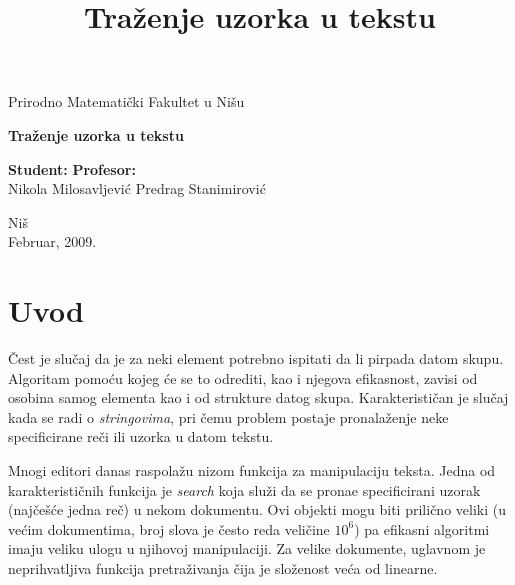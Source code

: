 \documentclass[a4paper,12pt]{article}
\title{\Huge \bf Tra\v zenje uzorka u tekstu}
\begin{document}
\renewcommand{\abstractname}{Apstrakt}
\renewcommand{\refname}{Literatura}
\renewcommand{\contentsname}{Sadr\v zaj}

\begin{titlepage}
\begin{center}
{\large Prirodno Matemati\v cki Fakultet u Ni\v su}
\end{center}
\vspace{7cm}
\begin{center}
{\Huge \textbf{Tra\v zenje uzorka u tekstu}}
\end{center}
\vspace{2cm}
\large \textbf{Student:} \hspace{9.1 cm} \textbf{Profesor:} \\
\large Nikola Milosavljevi\' c \hspace{4.6 cm} Predrag Stanimirovi\' c \vspace{6.5cm}
\begin{center}{Ni\v s\\
Februar, 2009.}\end{center}
\end{titlepage}

\thispagestyle{headings}

\tableofcontents

\newpage

\pagestyle{headings}

\section{Uvod}

\v Cest je slu\v caj da je za neki element potrebno ispitati da li pirpada datom skupu. Algoritam pomo\' cu kojeg \' ce se to odrediti, kao i njegova efikasnost, zavisi od osobina samog elementa kao i od strukture datog skupa. Karakteristi\v can je slu\v caj kada se radi o {\it stringovima}, pri \v cemu problem postaje pronala\v zenje neke specificirane re\v ci ili uzorka u datom tekstu.

Mnogi editori danas raspola\v zu nizom funkcija za manipulaciju teksta. Jedna od karakteristi\v cnih funkcija je {\it search} koja slu\v zi da se prona\dj e specificirani uzorak (naj\v ce\v s\' ce jedna re\v c) u nekom dokumentu. Ovi objekti mogu biti prili\v cno veliki (u ve\' cim dokumentima, broj slova je \v cesto reda veli\v cine $10^6$) pa efikasni algoritmi imaju veliku ulogu u njihovoj manipulaciji. Za velike dokumente, uglavnom je neprihvatljiva funkcija pretra\v zivanja \v cija je slo\v zenost ve\' ca od linearne.
\\
\end{document}
